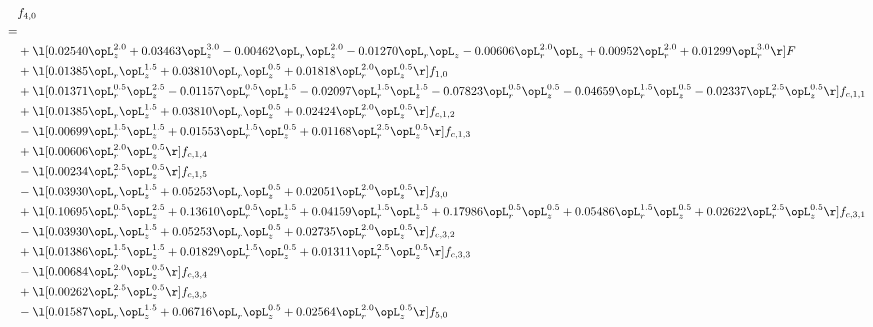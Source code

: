 \begin{alignat}{2} 
\label{eq:f_40_1} 
& f_{4,0} \nonumber \\ 
 = \\ 
& + \l[  0.02540 \opL_z^{2.0} +  0.03463 \opL_z^{3.0}   -0.00462 \opL_r \opL_z^{2.0}   -0.01270 \opL_r \opL_z   -0.00606 \opL_r^{2.0} \opL_z +  0.00952 \opL_r^{2.0} +  0.01299 \opL_r^{3.0}  \r] F \nonumber \\ 
& + \l[  0.01385 \opL_r \opL_z^{1.5} +  0.03810 \opL_r \opL_z^{0.5} +  0.01818 \opL_r^{2.0} \opL_z^{0.5}  \r] f_{1,0} \nonumber \\ 
& + \l[  0.01371 \opL_r^{0.5} \opL_z^{2.5}   -0.01157 \opL_r^{0.5} \opL_z^{1.5}   -0.02097 \opL_r^{1.5} \opL_z^{1.5}   -0.07823 \opL_r^{0.5} \opL_z^{0.5}   -0.04659 \opL_r^{1.5} \opL_z^{0.5}   -0.02337 \opL_r^{2.5} \opL_z^{0.5}  \r] f_{c,1,1} \nonumber \\ 
& + \l[  0.01385 \opL_r \opL_z^{1.5} +  0.03810 \opL_r \opL_z^{0.5} +  0.02424 \opL_r^{2.0} \opL_z^{0.5}  \r] f_{c,1,2} \nonumber \\ 
& - \l[  0.00699 \opL_r^{1.5} \opL_z^{1.5} +  0.01553 \opL_r^{1.5} \opL_z^{0.5} +  0.01168 \opL_r^{2.5} \opL_z^{0.5}  \r] f_{c,1,3} \nonumber \\ 
& + \l[  0.00606 \opL_r^{2.0} \opL_z^{0.5}  \r] f_{c,1,4} \nonumber \\ 
& - \l[  0.00234 \opL_r^{2.5} \opL_z^{0.5}  \r] f_{c,1,5} \nonumber \\ 
& - \l[  0.03930 \opL_r \opL_z^{1.5} +  0.05253 \opL_r \opL_z^{0.5} +  0.02051 \opL_r^{2.0} \opL_z^{0.5}  \r] f_{3,0} \nonumber \\ 
& + \l[  0.10695 \opL_r^{0.5} \opL_z^{2.5} +  0.13610 \opL_r^{0.5} \opL_z^{1.5} +  0.04159 \opL_r^{1.5} \opL_z^{1.5} +  0.17986 \opL_r^{0.5} \opL_z^{0.5} +  0.05486 \opL_r^{1.5} \opL_z^{0.5} +  0.02622 \opL_r^{2.5} \opL_z^{0.5}  \r] f_{c,3,1} \nonumber \\ 
& - \l[  0.03930 \opL_r \opL_z^{1.5} +  0.05253 \opL_r \opL_z^{0.5} +  0.02735 \opL_r^{2.0} \opL_z^{0.5}  \r] f_{c,3,2} \nonumber \\ 
& + \l[  0.01386 \opL_r^{1.5} \opL_z^{1.5} +  0.01829 \opL_r^{1.5} \opL_z^{0.5} +  0.01311 \opL_r^{2.5} \opL_z^{0.5}  \r] f_{c,3,3} \nonumber \\ 
& - \l[  0.00684 \opL_r^{2.0} \opL_z^{0.5}  \r] f_{c,3,4} \nonumber \\ 
& + \l[  0.00262 \opL_r^{2.5} \opL_z^{0.5}  \r] f_{c,3,5} \nonumber \\ 
& - \l[  0.01587 \opL_r \opL_z^{1.5} +  0.06716 \opL_r \opL_z^{0.5} +  0.02564 \opL_r^{2.0} \opL_z^{0.5}  \r] f_{5,0} \nonumber \\ 

\end{alignat}
